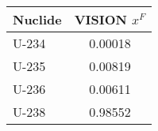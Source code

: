 \begin{tabular}{|l||c|}
\hline
\bf{Nuclide} & \bf{VISION $x^F$ \cite{Jacobson2009}} \\ 
\hline
U-234 & 0.00018 \\ 
\hline
U-235 & 0.00819 \\ 
\hline
U-236 & 0.00611 \\ 
\hline
U-238 & 0.98552 \\ 
\hline
\end{tabular}

